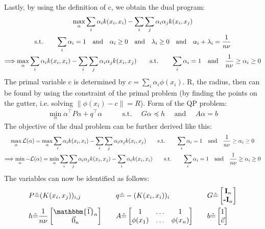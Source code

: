 \documentclass[a4paper]{article}
\newcommand{\norm}[1]{\left\lVert#1\right\rVert}
\newcommand{\1}{\mathds{1}}
\newcommand{\lag}{\mathcal{L}}
\begin{document}
Lastly, by using the definition of c, we obtain the dual program:
\begin{gather*}
	\max_\alpha \sum_i \alpha_i k(x_i,x_i) - \sum_i\sum_j\alpha_i\alpha_j k(x_i,x_j)
	\\
	\text{s.t.} \quad\quad
	\sum_i\alpha_i = 1
	\quad\text{and} \quad
	\alpha_i \geq 0
	\quad\text{and} \quad
	\lambda_i \geq 0
	\quad\text{and} \quad
	\alpha_i + \lambda_i = {1\over n\nu}
	\\
	\Longrightarrow
	\max_\alpha \sum_i \alpha_i k(x_i,x_i) - \sum_i\sum_j\alpha_i\alpha_j k(x_i,x_j)
	\quad\quad\text{s.t.} \quad\quad
	\sum_i\alpha_i = 1
	\quad\text{and} \quad
	{1\over n\nu} \geq \alpha_i \geq 0
\end{gather*}
The primal variable c is determined by $c=\sum_i\alpha_i\phi(x_i)$.
R, the radius, then can be found by using the constraint of the primal problem 
(by finding the points on the gutter, i.e. solving $\norm{\phi(x_i)-c} = R$).
\newpage
{}
Form of the QP problem:
\begin{align*}
	\min_\alpha \alpha^\top P\alpha + q^\top \alpha \quad\quad & \text{s.t. }\quad G\alpha\preceq h
	 \quad \text{ and }\quad A\alpha=b  
\end{align*}
The objective of the dual problem can be further derived like this:
\begin{gather*}
	\max_\alpha\lag(\alpha )
	=
	\max_\alpha \sum_i \alpha_i k(x_i,x_i) - \sum_i\sum_j\alpha_i\alpha_j k(x_i,x_j)
	\quad\quad\text{s.t.} \quad\quad
	\sum_i\alpha_i = 1
	\quad\text{and} \quad
	{1\over n\nu} \geq \alpha_i \geq 0
	\\
	\Longrightarrow
	\min_\alpha -\lag(\alpha )
	=
	\min_\alpha \sum_i\sum_j\alpha_i\alpha_j k(x_i,x_j) - \sum_i \alpha_i k(x_i,x_i) 
	\quad\quad\text{s.t.} \quad\quad
	\sum_i\alpha_i = 1
	\quad\text{and} \quad
	{1\over n\nu} \geq \alpha_i \geq 0	
\end{gather*}
The variables can now be identified as follows:
\begin{align*}
	& P\hat{=}(K(x_i,x_j))_{i,j} & \quad & 
	q\hat{=}-(K(x_i,x_i))_{i} & \quad & 
	G\hat{=} 
	\begin{bmatrix}
		\textbf{I}_n \\ 
		\textbf{-I}_n 
	\end{bmatrix}
	\\
	&h\hat{=}{1\over n\nu}
	\begin{bmatrix}
		\mathbbm{\vec{1}}_n \\ 
		\vec{0}_n 
	\end{bmatrix}	
	& \quad & A\hat{=}
	\begin{bmatrix}
		1 & \ldots & 1 \\ 
		\phi(x_1) & \ldots & \phi(x_n)  
	\end{bmatrix}
	& \quad & b\hat{=}
	\begin{bmatrix}
		1 \\ 
		\vec{c} 
	\end{bmatrix}
\end{align*} 
\end{document}

